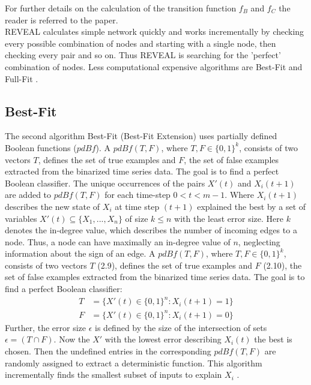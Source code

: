 For further details on the calculation of the transition function $f_{B}$ and $f_{C}$ the reader is referred to the paper.\\

REVEAL calculates simple network quickly and works incrementally by checking every possible combination of nodes and starting with a single node, then checking every pair and so on. Thus REVEAL is searching for the 'perfect' combination of nodes. Less computational expensive algorithms are Best-Fit and Full-Fit \citep{Barman.2017, Berestovsky.2013}. 


\subsection*{Best-Fit}
The second algorithm Best-Fit (Best-Fit Extension) uses partially defined Boolean functions ($pdBf$). A $pdBf(T,F)$, where $T,F\in \{0,1\}^{k}$, consists of two vectors $T$, defines the set of true examples and $F$, the set of false examples extracted from the binarized time series data. The goal is to find a perfect Boolean classifier. The unique occurrences of the pairs $X'(t)$ and $X_{i}(t+1)$ are added to $pdBf(T,F)$ for each time-step $0 < t < m-1$. Where $X_{i}(t+1)$ describes the new state of $X_{i}$ at time step $(t+1)$ explained the best by a set of variables $X'(t)\subseteq \{X_{1},...,X_{n}\}$ of size $k \le n$ with the least error size. Here $k$ denotes the in-degree value, which describes the number of incoming edges to a node. Thus, a node can have maximally an in-degree value of $n$, neglecting information about the sign of an edge. A $pdBf(T,F)$, where $T,F\in \{0,1\}^{k}$, consists of two vectors $T$ (2.9), defines the set of true examples and $F$ (2.10), the set of false examples extracted from the binarized time series data. The goal is to find a perfect Boolean classifier: 
\begin{align}
T & =\{X'(t)\in \{0,1\}^n : X_{i}(t+1)=1\}\\
F & =\{X'(t)\in \{0,1\}^n : X_{i}(t+1)=0\}
\end{align}
Further, the error size $ \epsilon $ is defined by the size of the intersection of sets $ \epsilon = (T \cap F)$. Now the $X'$ with the lowest error describing $X_{i}(t)$ the best is chosen. Then the undefined entries in the corresponding $pdBf(T,F)$ are randomly assigned to extract a deterministic function. This algorithm incrementally finds the smallest subset of inputs to explain $X_{i}$ \citep{Kim.2007}.


